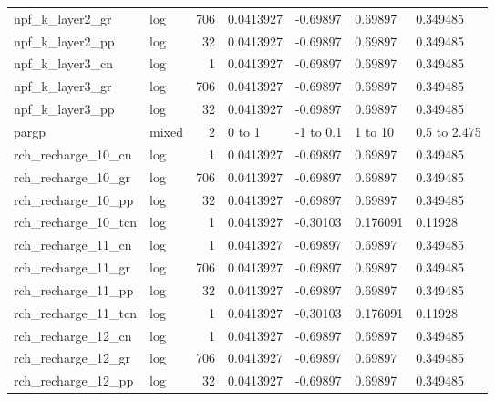 \documentclass{article}
\begin{document}
\begin{center}
\begin{landscape}
\begin{longtable}{llrllll}
    npf\_k\_layer2\_gr &       log &    706 &      0.0413927 &       -0.69897 &        0.69897 &           0.349485 \\
    npf\_k\_layer2\_pp &       log &     32 &      0.0413927 &       -0.69897 &        0.69897 &           0.349485 \\
    npf\_k\_layer3\_cn &       log &      1 &      0.0413927 &       -0.69897 &        0.69897 &           0.349485 \\
    npf\_k\_layer3\_gr &       log &    706 &      0.0413927 &       -0.69897 &        0.69897 &           0.349485 \\
    npf\_k\_layer3\_pp &       log &     32 &      0.0413927 &       -0.69897 &        0.69897 &           0.349485 \\
              pargp &     mixed &      2 &     0 to     1 &    -1 to   0.1 &     1 to    10 &       0.5 to 2.475 \\
 rch\_recharge\_10\_cn &       log &      1 &      0.0413927 &       -0.69897 &        0.69897 &           0.349485 \\
 rch\_recharge\_10\_gr &       log &    706 &      0.0413927 &       -0.69897 &        0.69897 &           0.349485 \\
 rch\_recharge\_10\_pp &       log &     32 &      0.0413927 &       -0.69897 &        0.69897 &           0.349485 \\
rch\_recharge\_10\_tcn &       log &      1 &      0.0413927 &       -0.30103 &       0.176091 &            0.11928 \\
 rch\_recharge\_11\_cn &       log &      1 &      0.0413927 &       -0.69897 &        0.69897 &           0.349485 \\
 rch\_recharge\_11\_gr &       log &    706 &      0.0413927 &       -0.69897 &        0.69897 &           0.349485 \\
 rch\_recharge\_11\_pp &       log &     32 &      0.0413927 &       -0.69897 &        0.69897 &           0.349485 \\
rch\_recharge\_11\_tcn &       log &      1 &      0.0413927 &       -0.30103 &       0.176091 &            0.11928 \\
 rch\_recharge\_12\_cn &       log &      1 &      0.0413927 &       -0.69897 &        0.69897 &           0.349485 \\
 rch\_recharge\_12\_gr &       log &    706 &      0.0413927 &       -0.69897 &        0.69897 &           0.349485 \\
 rch\_recharge\_12\_pp &       log &     32 &      0.0413927 &       -0.69897 &        0.69897 &           0.349485 \\

\end{longtable}
\end{landscape}
\end{center}
\end{document}
